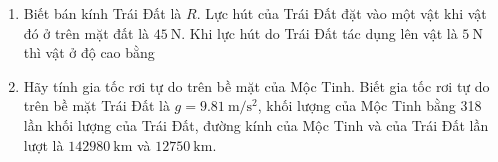 \begin{enumerate}[label=\bfseries Câu \arabic*:]
\item Biết bán kính Trái Đất là $R$. Lực hút của Trái Đất đặt vào một vật khi vật đó ở trên mặt đất là $\SI{45}{\newton}$. Khi lực hút do Trái Đất tác dụng lên vật là $\SI{5}{\newton}$ thì vật ở độ cao bằng

\item Hãy tính gia tốc rơi tự do trên bề mặt của Mộc Tinh. Biết gia tốc rơi tự do trên bề mặt Trái Đất là $g=\SI{9.81}{\meter/\second^2}$, khối lượng của Mộc Tinh bằng 318 lần khối lượng của Trái Đất, đường kính của Mộc Tinh và của Trái Đất lần lượt là $\SI{142980}{\kilo\meter}$ và $\SI{12750}{\kilo\meter}$.


\end{enumerate}
